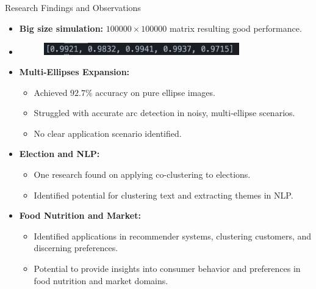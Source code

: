 \documentclass{beamer}
\begin{document}
\begin{frame}{Research Findings and Observations}
    \begin{itemize}
        \item \textbf{Big size simulation:} $100000\times 100000$ matrix resulting good performance.
        \item %
        \begin{figure}
            \centering
            \includegraphics[width=0.8\textwidth]{result.png}
        \end{figure}
        \item \textbf{Multi-Ellipses Expansion:} 
        \begin{itemize}
            \item Achieved $92.7\%$ accuracy on pure ellipse images.
            \item Struggled with accurate arc detection in noisy, multi-ellipse scenarios.
            \item No clear application scenario identified.
        \end{itemize}
        
        \item \textbf{Election and NLP:} 
        \begin{itemize}
            \item One research found on applying co-clustering to elections.
            \item Identified potential for clustering text and extracting themes in NLP.
        \end{itemize}
        
        \item \textbf{Food Nutrition and Market:} 
        \begin{itemize}
            \item Identified applications in recommender systems, clustering customers, and discerning preferences.
            \item Potential to provide insights into consumer behavior and preferences in food nutrition and market domains.
        \end{itemize}
    \end{itemize}
\end{frame}
\end{document}
